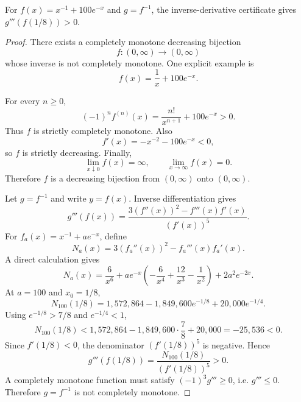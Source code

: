 \begin{proposition}
\label{res:keady-inverse-third-derivative-sign-certificate}
For \(f(x)=x^{-1}+100e^{-x}\) and \(g=f^{-1}\), the inverse-derivative certificate gives \(g'''(f(1/8))>0\).
\end{proposition}
\begin{proof}
There exists a completely monotone decreasing bijection
\[
f:(0,\infty)\to(0,\infty)
\]
whose inverse is not completely monotone. One explicit example is
\[
f(x)=\frac1x+100e^{-x}.
\]

For every \(n\ge0\),
\[
(-1)^n f^{(n)}(x)=\frac{n!}{x^{n+1}}+100e^{-x}>0.
\]
Thus \(f\) is strictly completely monotone. Also
\[
f'(x)=-x^{-2}-100e^{-x}<0,
\]
so \(f\) is strictly decreasing. Finally,
\[
\lim_{x\downarrow0}f(x)=\infty,
\qquad
\lim_{x\to\infty}f(x)=0.
\]
Therefore \(f\) is a decreasing bijection from \((0,\infty)\) onto \((0,\infty)\).

Let \(g=f^{-1}\) and write \(y=f(x)\). Inverse differentiation gives
\[
g'''(f(x))=\frac{3(f''(x))^2-f'''(x)f'(x)}{(f'(x))^5}.
\]
For \(f_a(x)=x^{-1}+ae^{-x}\), define
\[
N_a(x)=3(f_a''(x))^2-f_a'''(x)f_a'(x).
\]
A direct calculation gives
\[
N_a(x)=\frac6{x^6}+ae^{-x}\left(-\frac6{x^4}+\frac{12}{x^3}-\frac1{x^2}\right)+2a^2e^{-2x}.
\]
At \(a=100\) and \(x_0=1/8\),
\[
N_{100}(1/8)=1{,}572{,}864-1{,}849{,}600e^{-1/8}+20{,}000e^{-1/4}.
\]
Using \(e^{-1/8}>7/8\) and \(e^{-1/4}<1\),
\[
N_{100}(1/8)<1{,}572{,}864-1{,}849{,}600\cdot\frac78+20{,}000=-25{,}536<0.
\]
Since \(f'(1/8)<0\), the denominator \((f'(1/8))^5\) is negative. Hence
\[
g'''(f(1/8))=\frac{N_{100}(1/8)}{(f'(1/8))^5}>0.
\]
A completely monotone function must satisfy \((-1)^3g'''\ge0\), i.e. \(g'''\le0\). Therefore \(g=f^{-1}\) is not completely monotone.
\end{proof}


